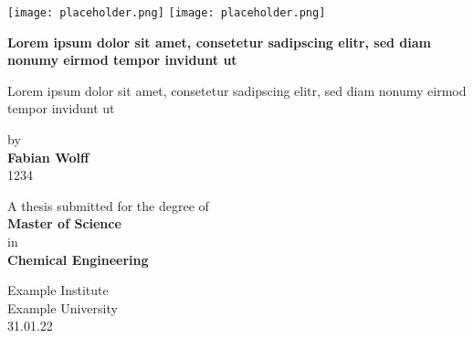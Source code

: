 \begin{titlepage}
	\texttt{[image: placeholder.png]}
	\hfill
	\texttt{[image: placeholder.png]}
	\begin{center}
		\vspace*{1cm}

		\LARGE
		\textbf{Lorem ipsum dolor sit amet, consetetur sadipscing elitr, sed diam nonumy eirmod tempor invidunt ut}

		\vspace*{0.4cm}
		\large
		Lorem ipsum dolor sit amet, consetetur sadipscing elitr, sed diam nonumy eirmod tempor invidunt ut

		\vspace*{0.4cm}
		by\\
		\vspace*{0.4cm}
		\textbf{Fabian Wolff}\\
		1234

		\vfill

		A thesis submitted for the degree of \\
		\textbf{Master of Science}\\
		\large
		in\\
		\textbf{Chemical Engineering}

		\vspace*{0.8cm}
		\large
		Example Institute\\
		Example University\\
		31.01.22

	\end{center}
\end{titlepage}